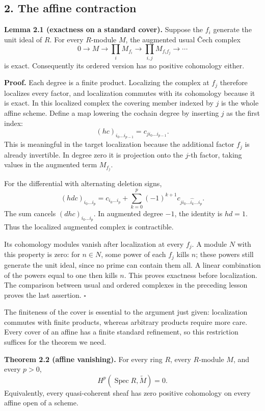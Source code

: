 \documentclass[11pt]{article}
\begin{document}
\subsection{2. The affine contraction}\label{the-affine-contraction}

\textbf{Lemma 2.1 (exactness on a standard cover).} Suppose the \(f_i\)
generate the unit ideal of \(R\). For every \(R\)-module \(M\), the
augmented usual Čech complex \[
0\longrightarrow M\longrightarrow
\prod_i M_{f_i}\longrightarrow
\prod_{i,j}M_{f_if_j}\longrightarrow\cdots
\] is exact. Consequently its ordered version has no positive cohomology
either.

\textbf{Proof.} Each degree is a finite product. Localizing the complex
at \(f_j\) therefore localizes every factor, and localization commutes
with its cohomology because it is exact. In this localized complex the
covering member indexed by \(j\) is the whole affine scheme. Define a
map lowering the cochain degree by inserting \(j\) as the first index:
\[
(hc)_{i_0\ldots i_{p-1}}=c_{j i_0\ldots i_{p-1}}.
\] This is meaningful in the target localization because the additional
factor \(f_j\) is already invertible. In degree zero it is projection
onto the \(j\)-th factor, taking values in the augmented term
\(M_{f_j}\).

For the differential with alternating deletion signs, \[
(hdc)_{i_0\ldots i_p}
=c_{i_0\ldots i_p}
 +\sum_{k=0}^p(-1)^{k+1}c_{j i_0\ldots\widehat{i_k}\ldots i_p}.
\] The sum cancels \((dhc)_{i_0\ldots i_p}\). In augmented degree
\(-1\), the identity is \(hd=1\). Thus the localized augmented complex
is contractible.

Its cohomology modules vanish after localization at every \(f_j\). A
module \(N\) with this property is zero: for \(n\in N\), some power of
each \(f_j\) kills \(n\); these powers still generate the unit ideal,
since no prime can contain them all. A linear combination of the powers
equal to one then kills \(n\). This proves exactness before
localization. The comparison between usual and ordered complexes in the
preceding lesson proves the last assertion. \(\square\)

The finiteness of the cover is essential to the argument just given:
localization commutes with finite products, whereas arbitrary products
require more care. Every cover of an affine has a finite standard
refinement, so this restriction suffices for the theorem we need.

\textbf{Theorem 2.2 (affine vanishing).} For every ring \(R\), every
\(R\)-module \(M\), and every \(p>0\), \[
H^p(\operatorname{Spec}R,\widetilde M)=0.
\] Equivalently, every quasi-coherent sheaf has zero positive cohomology
on every affine open of a scheme.
\end{document}
